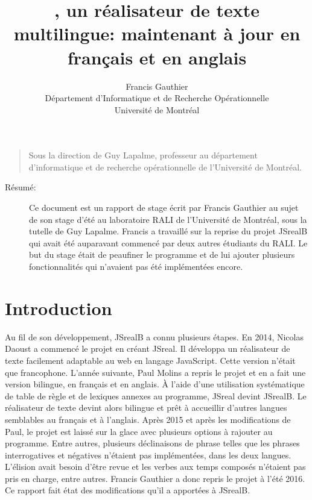 \documentclass[11pt]{article} %
\title{\JSB{}, un réalisateur de texte multilingue: maintenant à jour en
français et en anglais}
\author{Francis Gauthier\\Département d'Informatique et de Recherche Opérationnelle\\Université de Montréal}
\newcommand{\system}[1]{\textsf{#1}}
\newcommand{\JSB}{\system{JSrealB}}
\begin{document}
\maketitle


\begin{verse}
Sous la direction de Guy Lapalme, professeur au département d'informatique
et de recherche opérationnelle de l'Université de Montréal.
\end{verse}
\begin{description}
\item [{Résumé:}] Ce document est un rapport de stage écrit par Francis
Gauthier au sujet de son stage d'été au laboratoire RALI de l'Université
de Montréal, sous la tutelle de Guy Lapalme. Francis a travaillé sur
la reprise du projet \JSB{} qui avait été auparavant commencé par
deux autres étudiants du RALI. Le but du stage était de peaufiner
le programme et de lui ajouter plusieurs fonctionnalités qui n'avaient
pas été implémentées encore. 
\end{description}



\pagebreak
\begin{verse}
\tableofcontents{}
\end{verse}
\pagebreak


\section{Introduction}

Au fil de son développement, \JSB{} a connu plusieurs étapes. En
2014, Nicolas Daoust a commencé le projet en créant \system{JSreal}. Il développa
un réalisateur de texte facilement adaptable au web en langage JavaScript.
Cette version n'était que francophone. L'année suivante, Paul Molins
a repris le projet et en a fait une version bilingue, en français
et en anglais. À l'aide d'une utilisation systématique de table de
règle et de lexiques annexes au programme, \system{JSreal} devint \JSB{}.
Le réalisateur de texte devint alors bilingue et prêt à accueillir
d'autres langues semblables au français et à l'anglais. Après 2015
et après les modifications de Paul, le projet est laissé sur la glace
avec plusieurs options à rajouter au programme. Entre autres, plusieurs
déclinaisons de phrase telles que les phrases interrogatives et négatives
n'étaient pas implémentées, dans les deux langues. L'élision avait
besoin d'être revue et les verbes aux temps composés n'étaient pas
pris en charge, entre autres. Francis Gauthier a donc repris le projet
à l'été 2016. Ce rapport fait état des modifications qu'il a apportées
à \JSB{}.
\end{document}
